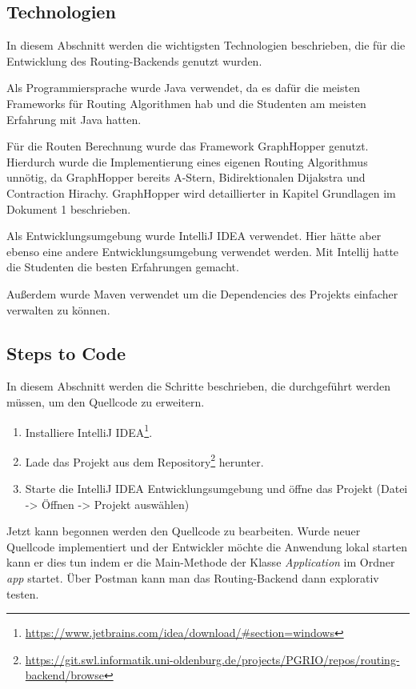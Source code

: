 {\subsection{Technologien}
In diesem Abschnitt werden die wichtigsten Technologien beschrieben, die für die Entwicklung des Routing-Backends genutzt wurden.

Als Programmiersprache wurde Java verwendet, da es dafür die meisten Frameworks für Routing Algorithmen hab und die Studenten am meisten Erfahrung mit Java hatten.

Für die Routen Berechnung wurde das Framework GraphHopper genutzt. Hierdurch wurde die Implementierung eines eigenen Routing Algorithmus unnötig, da GraphHopper bereits A-Stern, Bidirektionalen Dijakstra und Contraction Hirachy. GraphHopper wird detaillierter in Kapitel Grundlagen im Dokument 1 beschrieben.

Als Entwicklungsumgebung wurde IntelliJ IDEA verwendet. Hier hätte aber ebenso eine andere Entwicklungsumgebung verwendet werden. Mit Intellij hatte die Studenten die besten Erfahrungen gemacht.

Außerdem wurde Maven verwendet um die Dependencies des Projekts einfacher verwalten zu können.

\subsection{Steps to Code}
In diesem Abschnitt werden die Schritte beschrieben, die durchgeführt werden müssen, um den Quellcode zu erweitern.

\begin{enumerate}
	\item Installiere IntelliJ IDEA\footnote{\url{https://www.jetbrains.com/idea/download/\#section=windows}}.
	\item Lade das Projekt aus dem Repository\footnote{\url{https://git.swl.informatik.uni-oldenburg.de/projects/PGRIO/repos/routing-backend/browse}} herunter.
	 \item Starte die IntelliJ IDEA Entwicklungsumgebung und öffne das Projekt (Datei -> Öffnen -> Projekt auswählen)
\end{enumerate}
	 
Jetzt kann begonnen werden den Quellcode zu bearbeiten. 
Wurde neuer Quellcode implementiert und der Entwickler möchte die Anwendung lokal starten kann er dies tun indem er die Main-Methode der Klasse \textit{Application} im Ordner \textit{app} startet. Über Postman kann man das Routing-Backend dann explorativ testen.

}
